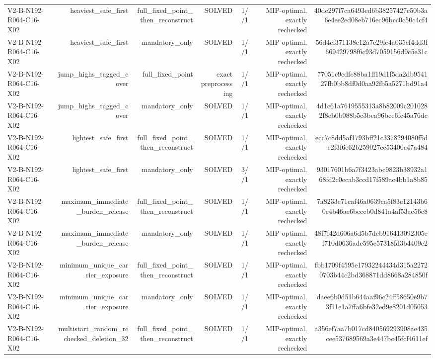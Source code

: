 {\begin{longtable}{lrrrrrr}
V2-B-N192-R064-C16-X02 & heaviest\_safe\_first & full\_fixed\_point\_then\_reconstruct & SOLVED & 1//1 & MIP-optimal, exactly rechecked & 40dc297f7ca6493ed6b38257427c50b3a6e4ee2ed08eb716ec96bcc0c50c4cf4 \\
V2-B-N192-R064-C16-X02 & heaviest\_safe\_first & mandatory\_only & SOLVED & 1//1 & MIP-optimal, exactly rechecked & 56d4cf371138e12a7c29fe4a035cf4dd3f669429798f6c93d7059156d9c5e31c \\
V2-B-N192-R064-C16-X02 & jump\_highs\_tagged\_cover & full\_fixed\_point & exact preprocessing & 1//1 & MIP-optimal, exactly rechecked & 77051c9cdfc88ba1ff19d1f5da2db954127fb0bb8df0d0aa92fb5a5271bd91a4 \\
V2-B-N192-R064-C16-X02 & jump\_highs\_tagged\_cover & mandatory\_only & SOLVED & 1//1 & MIP-optimal, exactly rechecked & 4d1c61a7619555313a8b82009c2010282f8cb0b088b5c3bea96bce6fc45a76dc \\
V2-B-N192-R064-C16-X02 & lightest\_safe\_first & full\_fixed\_point\_then\_reconstruct & SOLVED & 1//1 & MIP-optimal, exactly rechecked & ecc7c8dd5af1793bff21c3378294080f5dc2f3f6e62b259027cc53400c47a484 \\
V2-B-N192-R064-C16-X02 & lightest\_safe\_first & mandatory\_only & SOLVED & 3//1 & MIP-optimal, exactly rechecked & 93017601b6a7f3423abc9823b38932a168fd2c0ecab3ccd17f589ac4bb1a8b85 \\
V2-B-N192-R064-C16-X02 & maximum\_immediate\_burden\_release & full\_fixed\_point\_then\_reconstruct & SOLVED & 1//1 & MIP-optimal, exactly rechecked & 7a8233e71caf46a0639ca5f83e12143b60e4b46ae6bcceb0d841a4af53ae56c8 \\
V2-B-N192-R064-C16-X02 & maximum\_immediate\_burden\_release & mandatory\_only & SOLVED & 1//1 & MIP-optimal, exactly rechecked & 48f7f42d606a6d5b7dcb916413092305ef710d0636ade595c57318fd3b4409c2 \\
V2-B-N192-R064-C16-X02 & minimum\_unique\_carrier\_exposure & full\_fixed\_point\_then\_reconstruct & SOLVED & 1//1 & MIP-optimal, exactly rechecked & fbb1709f4595e17932244434d315a22720703b44c2bd368871dd8668a284850f \\
V2-B-N192-R064-C16-X02 & minimum\_unique\_carrier\_exposure & mandatory\_only & SOLVED & 1//1 & MIP-optimal, exactly rechecked & daee6b0d51b644aaf96c24ff58650e9b73f11e1a7ffa6bfe32ed9e8201d05053 \\
V2-B-N192-R064-C16-X02 & multistart\_random\_rechecked\_deletion\_32 & full\_fixed\_point\_then\_reconstruct & SOLVED & 1//1 & MIP-optimal, exactly rechecked & a356ef7aa7b017cd840569293908ae435cee537689569a3e447bc45fcf4611ef \\

\end{longtable}}
